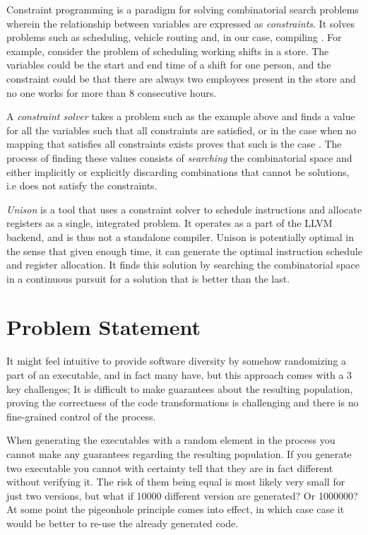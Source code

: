 Constraint programming is a paradigm for solving combinatorial search problems wherein
the relationship between variables are expressed as \textit{constraints}. It solves problems
such as scheduling, vehicle routing and, in our case, compiling
\cite{handbook-constraint-programming, unison-docs}. For example, consider the problem
of scheduling working shifts in a store. The variables could be the start and end time
of a shift for one person, and the constraint could be that there are always two employees
present in the store and no one works for more than 8 consecutive hours.

A \textit{constraint solver} takes a problem such as the example above and finds a value
for all the variables such that all constraints are satisfied, or in the case when no
mapping that satisfies all constraints exists proves that such is the case
\cite{handbook-constraint-programming}. The process of finding these values consists of
\textit{searching} the combinatorial space and either implicitly or explicitly discarding
combinations that cannot be solutions, i.e does not satisfy the constraints.

\textit{Unison} is a tool that uses a constraint solver to schedule instructions and allocate
registers as a single, integrated problem. It operates as a part of the LLVM backend, and
is thus not a standalone compiler. Unison is potentially optimal in the sense that given
enough time, it can generate the optimal instruction schedule and register allocation.
It finds this solution by searching the combinatorial space in a continuous pursuit for a
solution that is better than the last\cite{unison-docs}.

\section{Problem Statement}

It might feel intuitive to provide software diversity by somehow randomizing a part of an
executable, and in fact many have\cite{survey,librando,binary-stirring}, but this
approach comes with a 3 key challenges; It is difficult to make guarantees about the
resulting population, proving the correctness of the code transformations is challenging
and there is no fine-grained control of the process.

When generating the executables with a random element in the process you cannot make any
guarantees regarding the resulting population. If you generate two executable you cannot
with certainty tell that they are in fact different without verifying it. The risk of them
being equal is most likely very small for just two versions, but what if 10000 different
version are generated? Or 1000000? At some point the pigeonhole principle comes into
effect, in which case case it would be better to re-use the already generated code.

